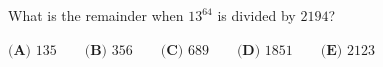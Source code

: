 What is the remainder when $13^{64}$ is divided by $2194$?

$\textbf{(A) } 135 \qquad \textbf{(B) } 356 \qquad \textbf{(C) } 689 \qquad \textbf{(D) } 1851\qquad \textbf{(E) } 2123$
